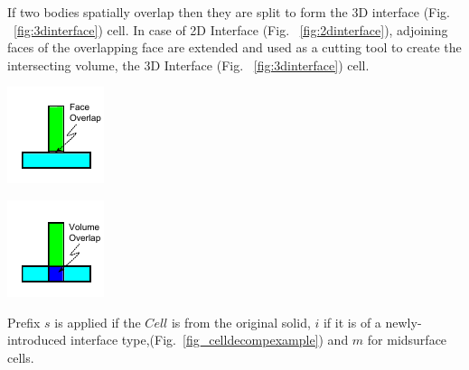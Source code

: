 If two bodies spatially overlap then they are split to form the 3D interface  (Fig. ~\ref{fig:3dinterface})  cell. In case of 2D Interface (Fig. ~\ref{fig:2dinterface}), adjoining faces of the overlapping face are extended \cite{Woo2002} and used as a  cutting tool to create the intersecting volume, the 3D Interface (Fig. ~\ref{fig:3dinterface}) cell.

%
\begin{minipage}[t]{\linewidth}
\centering \includegraphics[width=0.4\linewidth]{..//Common/images/Interface2d_1.pdf}
\label{fig:2dinterface}
\end{minipage}
%
%
\begin{minipage}[t]{\linewidth}
\centering \includegraphics[width=0.4\linewidth]{..//Common/images/Interface3d_1.pdf}
\label{fig:3dinterface}
\end{minipage}
%


\vspace{1mm}

Prefix $s$ is applied if the $Cell$ is from the original solid, $i$ if it is of a newly-introduced interface type,(Fig.~\ref{fig_celldecompexample}) and $m$ for midsurface cells.


